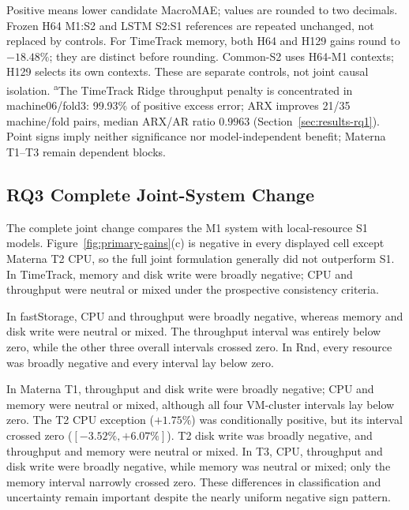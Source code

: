 \documentclass[5p,twocolumn]{elsarticle}
\begin{document}
\begin{table}[t]
\begin{tabular*}{\textwidth}{@{\extracolsep{\fill}}lrrrr@{}}
    \bottomrule
  \end{tabular*}
  \vspace{2pt}
  \parbox{\textwidth}{\footnotesize Positive means lower candidate MacroMAE; values are rounded to two decimals.
  Frozen H64 M1:S2 and LSTM S2:S1 references are repeated unchanged, not replaced by controls.
  For TimeTrack memory, both H64 and H129 gains round to $-18.48\%$; they are distinct before rounding.
  Common-S2 uses H64-M1 contexts; H129 selects its own contexts. These are separate controls, not joint causal isolation.
  \textsuperscript{a}The TimeTrack Ridge throughput penalty is concentrated in machine06/fold3:
  99.93\% of positive excess error; ARX improves 21/35 machine/fold pairs, median ARX/AR ratio $0.9963$ (Section~\ref{sec:results-rq1}).
  Point signs imply neither significance nor model-independent benefit; Materna T1--T3 remain dependent blocks.}
\end{table}


\subsection{RQ3 Complete Joint-System Change}
\label{sec:results-rq3}

The complete joint change compares the M1 system with local-resource S1
models.
Figure~\ref{fig:primary-gains}(c) is negative in every displayed cell except
Materna T2 CPU, so the full joint formulation generally did not outperform S1.
In TimeTrack, memory and disk write were broadly negative; CPU and throughput
were neutral or mixed under the prospective consistency criteria.

In fastStorage, CPU and throughput were broadly negative, whereas memory and
disk write were neutral or mixed. The throughput interval was entirely below
zero, while the other three overall intervals crossed zero. In Rnd, every
resource was broadly negative and every interval lay below zero.

In Materna T1, throughput and disk write were broadly negative; CPU and memory
were neutral or mixed, although all four VM-cluster intervals lay below zero.
The T2 CPU exception ($+1.75\%$) was conditionally positive, but its interval
crossed zero ($[-3.52\%,+6.07\%]$). T2 disk write was broadly negative, and
throughput and memory were neutral or mixed. In T3, CPU, throughput and disk
write were broadly negative, while memory was neutral or mixed; only the
memory interval narrowly crossed zero. These differences in classification
and uncertainty remain important despite the nearly uniform negative sign
pattern.
\end{document}
